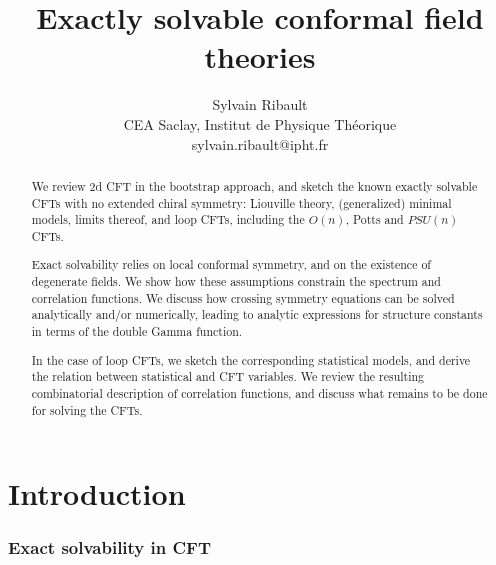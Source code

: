 \documentclass[12pt, a4paper]{article}
\title{\bfseries Exactly solvable conformal field theories}
\author{Sylvain Ribault \vspace{2mm}
\\
{\normalsize CEA Saclay, Institut de Physique Th\'eorique}
 \\
 {\footnotesize \ttfamily sylvain.ribault@ipht.fr }
}
\begin{document}
\maketitle


\begin{abstract}
We review 2d CFT in the bootstrap approach, and sketch the known exactly solvable CFTs with no extended chiral symmetry: Liouville theory, (generalized) minimal models, limits thereof, and loop CFTs, including the $O(n)$, Potts and $PSU(n)$ CFTs. 

Exact solvability relies on local conformal symmetry, and on the existence of degenerate fields. We show how these assumptions constrain the spectrum and correlation functions. We discuss how crossing symmetry equations can be solved analytically and/or numerically, leading to analytic expressions for structure constants in terms of the double Gamma function.  

In the case of loop CFTs, we sketch the corresponding statistical models, and derive the relation between statistical and CFT variables. We review the resulting combinatorial description of correlation functions, and discuss what remains to be done for solving the CFTs. 
\end{abstract}

\clearpage

\tableofcontents

\hypersetup{linkcolor=blue}

\setcounter{section}{-1}

\pagebreak

\section{Introduction}

\subsubsection*{Exact solvability in CFT}
\end{document}
